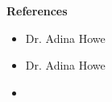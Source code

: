 \vspace{0.5cm}
{\LARGE \textbf{References}}
\makebox[\linewidth]{\rule{1.0\textwidth}{0.4pt}}\\

\begin{itemize}\setlength\itemsep{-.1cm}
    \item Dr. Adina Howe
    \item Dr. Adina Howe
    \item 
\end{itemize}

